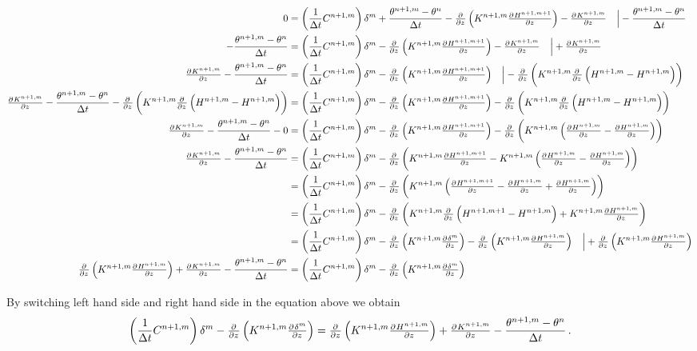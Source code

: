 \begin{landscape}
  \begin{align*}
    0 &= \del{\frac{1}{\Delta t} C^{n+1,m}} \delta^m + \frac{\theta^{n+1,m} - \theta^n}{\Delta t} - \pd{}{z} \del{ K^{n+1,m}\pd{H^{n+1,m+1}}{z} } - \pd{K^{n+1,m}}{z} \quad \Bigr\rvert - \frac{\theta^{n+1,m} - \theta^n}{\Delta t} \\
    - \frac{\theta^{n+1,m} - \theta^n}{\Delta t} &= \del{\frac{1}{\Delta t} C^{n+1,m}} \delta^m - \pd{}{z} \del{ K^{n+1,m}\pd{H^{n+1,m+1}}{z} } - \pd{K^{n+1,m}}{z} \quad \Bigr\rvert + \pd{K^{n+1,m}}{z} \\
    \pd{K^{n+1,m}}{z} - \frac{\theta^{n+1,m} - \theta^n}{\Delta t} &= \del{\frac{1}{\Delta t} C^{n+1,m}} \delta^m - \pd{}{z} \del{ K^{n+1,m}\pd{H^{n+1,m+1}}{z} } \quad \Bigr\rvert - \pd{}{z} \del{ K^{n+1,m}\pd{}{z}\del{ H^{n+1,m} - H^{n+1,m} } } \\
    \pd{K^{n+1,m}}{z} - \frac{\theta^{n+1,m} - \theta^n}{\Delta t} - \pd{}{z} \del{ K^{n+1,m}\pd{}{z}\del{ H^{n+1,m} - H^{n+1,m} } } &= \del{\frac{1}{\Delta t} C^{n+1,m}} \delta^m - \pd{}{z} \del{ K^{n+1,m}\pd{H^{n+1,m+1}}{z} } - \pd{}{z} \del{ K^{n+1,m}\pd{}{z}\del{ H^{n+1,m} - H^{n+1,m} } } \\
    \pd{K^{n+1,m}}{z} - \frac{\theta^{n+1,m} - \theta^n}{\Delta t} - 0 &= \del{ \frac{1}{\Delta t} C^{n+1,m} } \delta^m - \pd{}{z} \del{ K^{n+1,m}\pd{H^{n+1,m+1}}{z} } - \pd{}{z} \del{ K^{n+1,m}\del{ \pd{H^{n+1,m}}{z} - \pd{H^{n+1,m}}{z} } } \\
    \pd{K^{n+1,m}}{z} - \frac{\theta^{n+1,m} - \theta^n}{\Delta t} &= \del{ \frac{1}{\Delta t} C^{n+1,m} } \delta^m - \pd{}{z} \del{ K^{n+1,m}\pd{H^{n+1,m+1}}{z} - K^{n+1,m}\del{ \pd{H^{n+1,m}}{z} - \pd{H^{n+1,m}}{z} } } \\
      &= \del{ \frac{1}{\Delta t} C^{n+1,m} } \delta^m - \pd{}{z} \del{ K^{n+1,m} \del{ \pd{H^{n+1,m+1}}{z} - \pd{H^{n+1,m}}{z} + \pd{H^{n+1,m}}{z} } } \\
      &= \del{ \frac{1}{\Delta t} C^{n+1,m} } \delta^m - \pd{}{z} \del{ K^{n+1,m} \pd{}{z} \del{ H^{n+1,m+1} - H^{n+1,m} } + K^{n+1,m} \pd{H^{n+1,m}}{z} } \\
      &= \del{ \frac{1}{\Delta t} C^{n+1,m} } \delta^m - \pd{}{z} \del{ K^{n+1,m} \pd{\delta^m}{z} } - \pd{}{z} \del{ K^{n+1,m} \pd{H^{n+1,m}}{z} } \quad \Bigr\rvert + \pd{}{z} \del{ K^{n+1,m} \pd{H^{n+1,m}}{z} } \\
    \pd{}{z} \del{ K^{n+1,m} \pd{H^{n+1,m}}{z} } + \pd{K^{n+1,m}}{z} - \frac{\theta^{n+1,m} - \theta^n}{\Delta t} &= \del{ \frac{1}{\Delta t} C^{n+1,m} } \delta^m - \pd{}{z} \del{ K^{n+1,m} \pd{\delta^m}{z} }
  \end{align*}
\end{landscape}
\newpage
By switching left hand side and right hand side in the equation above we obtain \parencite{celia_general_1990}
\begin{equation}
  \label{eq:celia_16}
  \del{ \frac{1}{\Delta t} C^{n+1,m} } \delta^m - \pd{}{z} \del{ K^{n+1,m} \pd{\delta^m}{z} } = \pd{}{z} \del{ K^{n+1,m} \pd{H^{n+1,m}}{z} } + \pd{K^{n+1,m}}{z} - \frac{\theta^{n+1,m} - \theta^n}{\Delta t} \, .
\end{equation}

